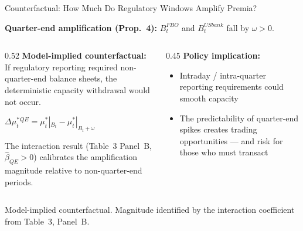 \documentclass[aspectratio=169, 10pt]{beamer}
\newcommand{\mustar}{\mu_t^{*}}      %
\begin{document}
\begin{frame}{Counterfactual: How Much Do Regulatory Windows Amplify Premia?}

  \textbf{Quarter-end amplification (Prop.~4):} $B_t^{FBO}$ and $B_t^{USbank}$ fall by $\omega > 0$.

  \bigskip

  \begin{columns}
    \begin{column}{0.52\textwidth}
      \textbf{Model-implied counterfactual:}\\
      If regulatory reporting required non-quarter-end balance sheets,
      the deterministic capacity withdrawal would not occur.

      \medskip
      $\Delta\mustar^{QE} = \mustar|_{B_t} - \mustar|_{B_t + \omega}$

      \medskip
      The interaction result (Table~3 Panel~B, $\hat\beta_{QE} > 0$) calibrates
      the amplification magnitude relative to non-quarter-end periods.
    \end{column}
    \begin{column}{0.45\textwidth}
      \textbf{Policy implication:}
      \begin{itemize}
        \item Intraday / intra-quarter reporting requirements
          could smooth capacity
        \item The predictability of quarter-end spikes creates
          trading opportunities --- and risk for those who must transact
      \end{itemize}
    \end{column}
  \end{columns}

  \bigskip

  {\color{dimgray}\small Model-implied counterfactual. Magnitude identified by
    the interaction coefficient from Table~3, Panel~B.}

\end{frame}
\end{document}
